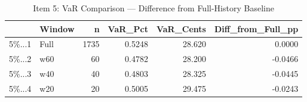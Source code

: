 \begin{table}

\caption{\label{tab:export_latex_tables}Item 5: VaR Comparison — Difference from Full-History Baseline}
\centering
\begin{tabular}[t]{llrrrr}
\toprule
  & Window & n & VaR\_Pct & VaR\_Cents & Diff\_from\_Full\_pp\\
\midrule
5\%...1 & Full & 1735 & 0.5248 & 28.620 & 0.0000\\
5\%...2 & w60 & 60 & 0.4782 & 28.200 & -0.0466\\
5\%...3 & w40 & 40 & 0.4803 & 28.325 & -0.0445\\
5\%...4 & w20 & 20 & 0.5005 & 29.475 & -0.0243\\
\bottomrule
\end{tabular}
\end{table}
